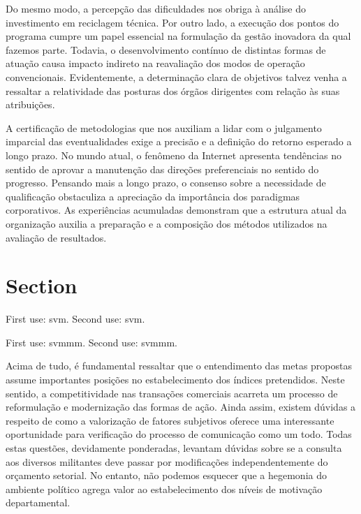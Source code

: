 \documentclass[a4paper,12pt]{udesc}
\begin{document}
          Do mesmo modo, a percepção das dificuldades nos obriga à análise do investimento em reciclagem técnica. Por outro lado, a execução dos pontos do programa cumpre um papel essencial na formulação da gestão inovadora da qual fazemos parte. Todavia, o desenvolvimento contínuo de distintas formas de atuação causa impacto indireto na reavaliação dos modos de operação convencionais. Evidentemente, a determinação clara de objetivos talvez venha a ressaltar a relatividade das posturas dos órgãos dirigentes com relação às suas atribuições.




          A certificação de metodologias que nos auxiliam a lidar com o julgamento imparcial das eventualidades exige a precisão e a definição do retorno esperado a longo prazo. No mundo atual, o fenômeno da Internet apresenta tendências no sentido de aprovar a manutenção das direções preferenciais no sentido do progresso. Pensando mais a longo prazo, o consenso sobre a necessidade de qualificação obstaculiza a apreciação da importância dos paradigmas corporativos. As experiências acumuladas demonstram que a estrutura atual da organização auxilia a preparação e a composição dos métodos utilizados na avaliação de resultados.


\section{Section}



First use: \gls{svm}. Second use: \gls{svm}.

First use: \gls{svmmm}. Second use: \gls{svmmm}.





Acima de tudo, é fundamental ressaltar que o entendimento das metas propostas assume importantes posições no estabelecimento dos índices pretendidos. Neste sentido, a competitividade nas transações comerciais acarreta um processo de reformulação e modernização das formas de ação. Ainda assim, existem dúvidas a respeito de como a valorização de fatores subjetivos oferece uma interessante oportunidade para verificação do processo de comunicação como um todo. Todas estas questões, devidamente ponderadas, levantam dúvidas sobre se a consulta aos diversos militantes deve passar por modificações independentemente do orçamento setorial. No entanto, não podemos esquecer que a hegemonia do ambiente político agrega valor ao estabelecimento dos níveis de motivação departamental. 
\end{document}
